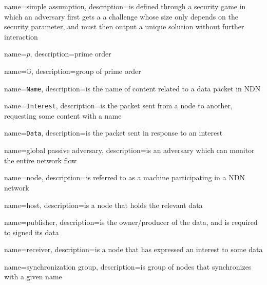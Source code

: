 {
  name=simple assumption,
  description={is defined through a security game in which an adversary first gets a a challenge whose size only depends on the security
  parameter, and must then output a unique solution without further interaction~\cite{DBLP:conf/pkc/HofheinzKS15}}
}

{
  name=$p$,
  description={prime order}
}

{
  name=$\mathbb{G}$,
  description={group of prime order}
}

{
  name=\texttt{Name},
  description={is the name of content related to a \gls{data} packet in NDN}
}

{
  name=\texttt{Interest},
  description={is the packet sent from a node to another, requesting some content with a \gls{name}}
}


{
  name=\texttt{Data},
  description={is the packet sent in response to an \gls{interest}}
}

{
  name=global passive adversary,
  description={is an adversary which can monitor the entire network flow}
}

{
  name=node,
  description={is referred to as a machine participating in a \gls{NDN} network}
}

{
  name=host,
  description={is a node that holds the relevant \gls{data}}
}

{
  name=publisher,
  description={is the owner/producer of the \gls{data}, and is required to signed its \gls{data}}
}

{
  name=receiver,
  description={is a node that has expressed an \gls{interest} to some \gls{data}}
}

{
  name=synchronization group,
  description={is group of nodes that synchronizes with a given \gls{name}}
}